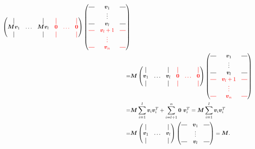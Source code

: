 \begin{align}
\begin{pmatrix}
    \vertbar       &        & \vertbar       & \red{\vertbar} & \red{        } & \red{\vertbar} \\
    \bm{M}\bm{v}_1 & \hdots & \bm{M}\bm{v}_l & \red{\bm{0}  } & \red{ \hdots } & \red{\bm{0}}   \\
    \vertbar       &        & \vertbar       & \red{\vertbar} & \red{        } & \red{\vertbar}
    \end{pmatrix}
    \begin{pmatrix}
        \horzbar & \bm{v}_1   & \horzbar \\
                    & \vdots     &          \\
        \horzbar & \bm{v}_l   & \horzbar \\
        \red{\horzbar} & \red{\bm{v}_l+1} & \red{\horzbar} \\
                        & \red{\vdots    } &                \\
        \red{\horzbar} & \red{\bm{v}_n  } & \red{\horzbar} \\
    \end{pmatrix}\\
    =& \bm{M}\begin{pmatrix}
    \vertbar       &        & \vertbar       & \red{\vertbar} & \red{        } & \red{\vertbar} \\
    \bm{v}_1 & \hdots & \bm{v}_l & \red{\bm{0}  } & \red{ \hdots } & \red{\bm{0}}   \\
    \vertbar       &        & \vertbar       & \red{\vertbar} & \red{        } & \red{\vertbar}
    \end{pmatrix}
    \begin{pmatrix}
        \horzbar & \bm{v}_1   & \horzbar \\
                    & \vdots     &          \\
        \horzbar & \bm{v}_l   & \horzbar \\
        \red{\horzbar} & \red{\bm{v}_l+1} & \red{\horzbar} \\
                        & \red{\vdots    } &                \\
        \red{\horzbar} & \red{\bm{v}_n  } & \red{\horzbar} \\
    \end{pmatrix} \\
    =&
    \bm{M} \sum_{i=1}^l \bm{v}_i \bm{v}_i^T + \sum_{i=l+1}^n \bm{0} \ \bm{v}_i^T =
    \bm{M} \sum_{i=1}^l \bm{v}_i \bm{v}_i^T  \\
    =&     \bm{M}
    \begin{pmatrix}
    \vertbar &        & \vertbar \\
    \bm{v}_1 & \hdots & \bm{v}_l \\
    \vertbar &        & \vertbar 
    \end{pmatrix}
    \begin{pmatrix}
        \horzbar & \bm{v}_1 & \horzbar \\
                    & \vdots   &  \\
        \horzbar & \bm{v}_l &  \horzbar \\
    \end{pmatrix} = \bm{M}.
\end{align}
